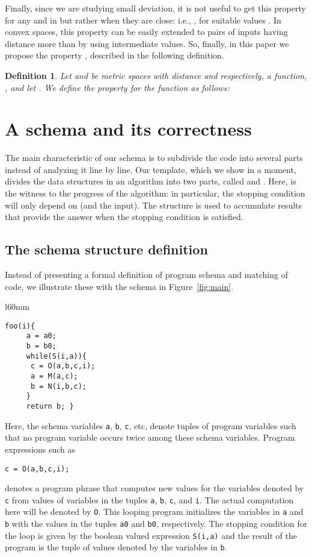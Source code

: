 \documentclass[copyright,creativecommons]{eptcs}
\newtheorem{definition}{Definition}[section]
\begin{document}
Finally, since we are studying small deviation, it is not useful to
get this property for any  and  in  but rather when they are
close: i.e., , for suitable values .
In convex spaces, this property can be easily extended to  
pairs of inputs  having distance more than  by using intermediate
values.  So, finally, in this paper we propose the property , 
described in the following definition.

\begin{definition}\label{def:k-epsilon-delta}
Let  and  be metric spaces with distance  and 
respectively,  a function, , and let
.  We define the
property  for the function  as follows: 

\end{definition}




\section{A schema and its correctness}\label{sec:control}
The main characteristic  of our schema is to subdivide the code into
several parts instead of analyzing it line by line. 
Our template, which we show in a moment, divides the data structures
in an algorithm into two parts, called  and .  Here,  is the
witness to the progress of the algorithm: in particular, the stopping
condition will only depend on  (and the input).   The structure 
is used to accumulate results that provide the answer when the
stopping condition is satisfied.

\subsection{The schema structure definition}\label{sec:schema}
Instead of
presenting a formal definition of program schema and matching of
code, we illustrate these with the schema in Figure~\ref{fig:main}.  

\begin{wrapfigure}{l}{60mm}
\begin{lstlisting}[language=pscode]
foo(i){
     a = a0;
     b = b0;
     while(S(i,a)){
	  c = O(a,b,c,i);
	  a = M(a,c);
	  b = N(i,b,c);
     }
     return b; }
\end{lstlisting}
\caption{The main template}\label{fig:main}
\end{wrapfigure}

Here, the schema variables {\tt a}, {\tt b}, {\tt c}, etc, denote
tuples of program variables such that no program variable occurs
twice among these schema variables. Program expressions such as 
\begin{lstlisting}
c = O(a,b,c,i);
\end{lstlisting}
denotes a program phrase that computes new values for the variables denoted
by {\tt c} from values of variables in the tuples {\tt a}, {\tt b},
{\tt c}, and {\tt i}.  The actual computation here will be denoted by
{\tt O}.  This looping program initializes the variables in {\tt a} and
{\tt b} with the values in the tuples {\tt a0} and
{\tt b0}, respectively.  The stopping condition for the loop is given
by the boolean valued expression {\tt S(i,a)} and the result of the
program is the tuple of values denoted by the variables in {\tt b}. 
\end{document}
